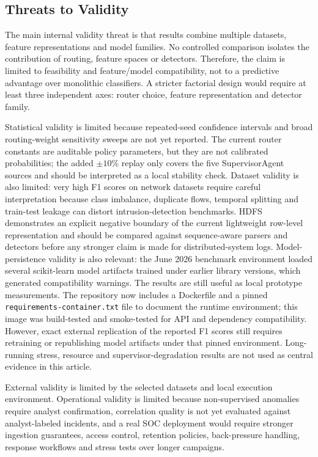 \documentclass[conference]{IEEEtran}
\begin{document}
\subsection{Threats to Validity}
The main internal validity threat is that results combine multiple datasets, feature representations and model families. No controlled comparison isolates the contribution of routing, feature spaces or detectors. Therefore, the claim is limited to feasibility and feature/model compatibility, not to a predictive advantage over monolithic classifiers. A stricter factorial design would require at least three independent axes: router choice, feature representation and detector family.

Statistical validity is limited because repeated-seed confidence intervals and broad routing-weight sensitivity sweeps are not yet reported. The current router constants are auditable policy parameters, but they are not calibrated probabilities; the added $\pm10\%$ replay only covers the five SupervisorAgent sources and should be interpreted as a local stability check. Dataset validity is also limited: very high F1 scores on network datasets require careful interpretation because class imbalance, duplicate flows, temporal splitting and train-test leakage can distort intrusion-detection benchmarks. HDFS demonstrates an explicit negative boundary of the current lightweight row-level representation and should be compared against sequence-aware parsers and detectors before any stronger claim is made for distributed-system logs. Model-persistence validity is also relevant: the June 2026 benchmark environment loaded several scikit-learn model artifacts trained under earlier library versions, which generated compatibility warnings. The results are still useful as local prototype measurements. The repository now includes a Dockerfile and a pinned \texttt{requirements-container.txt} file to document the runtime environment; this image was build-tested and smoke-tested for API and dependency compatibility. However, exact external replication of the reported F1 scores still requires retraining or republishing model artifacts under that pinned environment. Long-running stress, resource and supervisor-degradation results are not used as central evidence in this article.

External validity is limited by the selected datasets and local execution environment. Operational validity is limited because non-supervised anomalies require analyst confirmation, correlation quality is not yet evaluated against analyst-labeled incidents, and a real SOC deployment would require stronger ingestion guarantees, access control, retention policies, back-pressure handling, response workflows and stress tests over longer campaigns.
\end{document}
